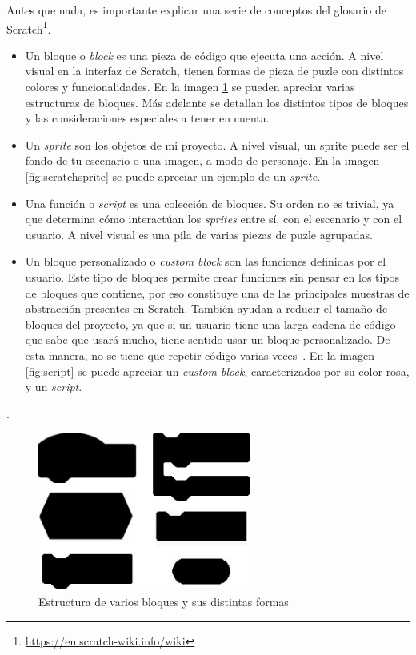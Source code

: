 \documentclass[a4paper, 12pt]{book}
\begin{document}
Antes que nada, es importante explicar una serie de conceptos del glosario de Scratch\footnote{\url{https://en.scratch-wiki.info/wiki}}. 


\begin{itemize}
 \item Un bloque o \textit{block} es una pieza de código que ejecuta una acción. A nivel visual en la interfaz de Scratch, tienen formas de pieza de puzle con distintos colores y funcionalidades. En la imagen \ref{fig:blocks} se pueden apreciar varias estructuras de bloques. Más adelante se detallan los distintos tipos de bloques y las consideraciones especiales a tener en cuenta. 
 \item Un \textit{sprite} son los objetos de mi proyecto. A nivel visual, un sprite puede ser el fondo de tu escenario o una imagen, a modo de personaje. En la imagen \ref{fig:scratchsprite} se puede apreciar un ejemplo de un \textit{sprite}.
 \item Una función o \textit{script} es una colección de bloques. Su orden no es trivial, ya que determina cómo interactúan los \textit{sprites} entre sí, con el escenario y con el usuario. A nivel visual es una pila de varias piezas de puzle agrupadas.
 \item Un bloque personalizado o \textit{custom block} son las funciones definidas por el usuario. Este tipo de bloques permite crear funciones sin pensar en los tipos de bloques que contiene, por eso constituye una de las principales muestras de abstracción presentes en Scratch. También ayudan a reducir el tamaño de bloques del proyecto, ya que si un usuario tiene una larga cadena de código que sabe que usará mucho, tiene sentido usar un bloque personalizado. De esta manera, no se tiene que repetir código varias veces~\cite{scratchWeb}. En la imagen \ref{fig:script} se puede apreciar un \textit{custom block}, caracterizados por su color rosa, y un \textit{script}.
\end{itemize}.

\begin{figure}[htb!]
	\centering
    \includegraphics[width=7cm, keepaspectratio]{img/blocks.jpg}
    \caption{Estructura de varios bloques y sus distintas formas}
    \label{fig:blocks}
\end{figure} 
 
\end{document}
